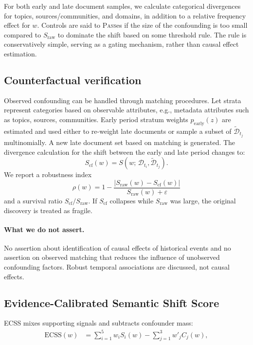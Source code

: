 \documentclass{llncs}
\begin{document}
For both early and late document samples, we calculate categorical divergences for topics, sources/communities, and domains, in addition to a relative frequency effect for $w$. Controls are said to \textsc{Pass}es if the size of the confounding is too small compared to $S_{\mathrm{raw}}$ to dominate the shift based on some threshold rule. The rule is conservatively simple, serving as a gating mechanism, rather than causal effect estimation.

\subsection{Counterfactual verification}
Observed confounding can be handled through matching procedures. Let strata represent categories based on observable attributes, e.g., metadata attributes such as topics, sources, communities. Early period stratum weights $p_{\mathrm{early}}(z)$ are estimated and used either to re-weight late documents or sample a subset of $\tilde{\mathcal{D}}_{t_j}$ multinomially. A new late document set based on matching is generated. The divergence calculation for the shift between the early and late period changes to:
\begin{equation}
S_{\mathrm{cf}}(w)=S\!\left(w;\,\mathcal{D}_{t_i},\tilde{\mathcal{D}}_{t_j}\right).
\end{equation}
We report a robustness index
\begin{equation}
\rho(w)=1-\frac{\lvert S_{\mathrm{raw}}(w)-S_{\mathrm{cf}}(w)\rvert}{S_{\mathrm{raw}}(w)+\varepsilon}
\end{equation}
and a survival ratio $S_{\mathrm{cf}}/S_{\mathrm{raw}}$.
If $S_{\mathrm{cf}}$ collapses while $S_{\mathrm{raw}}$ was large, the original discovery is treated as fragile.

\paragraph{What we do not assert.}
No assertion about identification of causal effects of historical events and no assertion on observed matching that reduces the influence of unobserved confounding factors. Robust temporal associations are discussed, not causal effects.

\subsection{Evidence-Calibrated Semantic Shift Score}
ECSS mixes supporting signals and subtracts confounder mass:
\begin{equation}
\begin{aligned}
\mathrm{ECSS}(w)
&=
\sum_{i=1}^{5} w_i S_i(w)
-
\sum_{j=1}^{3} w'_j C_j(w),
\end{aligned}
\end{equation}
\end{document}
